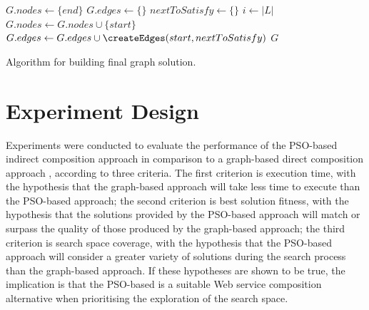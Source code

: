 \documentclass{llncs}
\begin{document}
\begin{algorithm}
\setlength{}
 \LinesNumbered
 \SetNlSty{}{}{:}
 $G.nodes \leftarrow \{end\}$\;
 $G.edges \leftarrow \{\}$\;
 $nextToSatisfy \leftarrow \{\}$\;
 $i \leftarrow |L|$\;
 $G.nodes \leftarrow G.nodes \cup \{start\}$\;
 $G.edges \leftarrow G.edges \cup \createEdges(start,nextToSatisfy)$\;
 \Return $G$\;
\caption{Algorithm for building final graph solution.}
\label{solutionBuilding}
\end{algorithm}

\section{Experiment Design}\label{experiment_design}

Experiments were conducted to evaluate the performance of the PSO-based indirect composition approach in comparison to a graph-based direct composition approach \cite{da2015graphevol}, according to three criteria. The first criterion is execution time, with the hypothesis that the graph-based approach will take less time to execute than the PSO-based approach; the second criterion is best solution fitness, with the hypothesis that the solutions provided by the PSO-based approach will match or surpass the quality of those produced by the graph-based approach; the third criterion is search space coverage, with the hypothesis that the PSO-based approach will consider a greater variety of solutions during the search process than the graph-based approach. If these hypotheses are shown to be true, the implication is that the PSO-based is a suitable Web service composition alternative when prioritising the exploration of the search space.
\end{document}
